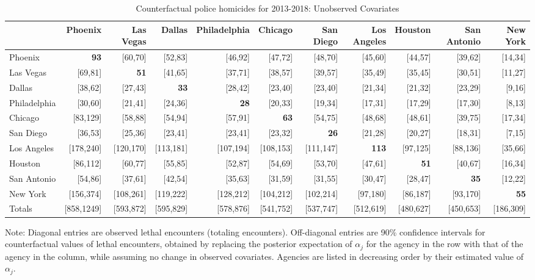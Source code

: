 \begin{table}[h!]\centering\scriptsize\tabcolsep=0.1cm\caption{Counterfactual police homicides for 2013-2018: Unobserved Covariates} \label{table:bootstrap_counterfactual_unobs}\begin{tabular}{lrrrrrrrrrr}\hline \hline&Phoenix&Las Vegas&Dallas&Philadelphia&Chicago&San Diego&Los Angeles&Houston&San Antonio&New York\\
\hline
Phoenix&\textbf{93}&[60,70]&[52,83]&[46,92]&[47,72]&[48,70]&[45,60]&[44,57]&[39,62]&[14,34]\\
Las Vegas&[69,81]&\textbf{51}&[41,65]&[37,71]&[38,57]&[39,57]&[35,49]&[35,45]&[30,51]&[11,27]\\
Dallas&[38,62]&[27,43]&\textbf{33}&[28,42]&[23,40]&[23,40]&[21,34]&[21,32]&[23,29]&[9,16]\\
Philadelphia&[30,60]&[21,41]&[24,36]&\textbf{28}&[20,33]&[19,34]&[17,31]&[17,29]&[17,30]&[8,13]\\
Chicago&[83,129]&[58,88]&[54,94]&[57,91]&\textbf{63}&[54,75]&[48,68]&[48,61]&[39,75]&[17,34]\\
San Diego&[36,53]&[25,36]&[23,41]&[23,41]&[23,32]&\textbf{26}&[21,28]&[20,27]&[18,31]&[7,15]\\
Los Angeles&[178,240]&[120,170]&[113,181]&[107,194]&[108,153]&[111,147]&\textbf{113}&[97,125]&[88,136]&[35,66]\\
Houston&[86,112]&[60,77]&[55,85]&[52,87]&[54,69]&[53,70]&[47,61]&\textbf{51}&[40,67]&[16,34]\\
San Antonio&[54,86]&[37,61]&[42,54]&[35,63]&[31,59]&[31,55]&[30,47]&[28,47]&\textbf{35}&[12,22]\\
New York&[156,374]&[108,261]&[119,222]&[128,212]&[104,212]&[102,214]&[97,180]&[86,187]&[93,170]&\textbf{55}\\
\hline
Totals&[858,1249]&[593,872]&[595,829]&[578,876]&[541,752]&[537,747]&[512,619]&[480,627]&[450,653]&[186,309]\\
\hline\end{tabular}\begin{center}\begin{minipage}{1.05\textwidth} %
 {\footnotesize {\schape Note}: Diagonal entries are observed lethal encounters (totaling \totalincidentsten{} encounters). Off-diagonal entries are 90\% confidence intervals for counterfactual values of lethal encounters, obtained by replacing the posterior expectation of $\alpha_j$ for the agency in the row with that of the agency in the column, while assuming no change in observed covariates. Agencies are listed in decreasing order by their estimated value of $\alpha_j$.} 
 \end{minipage} 
 \end{center} 
 \end{table} 
